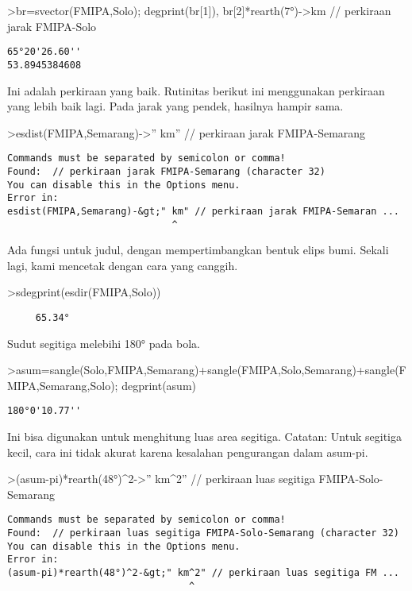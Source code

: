 \documentclass[
]{book}
\begin{document}
\textgreater br=svector(FMIPA,Solo); degprint(br{[}1{]}), br{[}2{]}*rearth(7°)-\textgreater km // perkiraan jarak FMIPA-Solo

\begin{verbatim}
65°20'26.60''
53.8945384608
\end{verbatim}

Ini adalah perkiraan yang baik. Rutinitas berikut ini menggunakan perkiraan yang lebih baik lagi. Pada jarak yang pendek, hasilnya hampir sama.

\textgreater esdist(FMIPA,Semarang)-\textgreater'' km'' // perkiraan jarak FMIPA-Semarang

\begin{verbatim}
Commands must be separated by semicolon or comma!
Found:  // perkiraan jarak FMIPA-Semarang (character 32)
You can disable this in the Options menu.
Error in:
esdist(FMIPA,Semarang)-&gt;" km" // perkiraan jarak FMIPA-Semaran ...
                             ^
\end{verbatim}

Ada fungsi untuk judul, dengan mempertimbangkan bentuk elips bumi. Sekali lagi, kami mencetak dengan cara yang canggih.

\textgreater sdegprint(esdir(FMIPA,Solo))

\begin{verbatim}
     65.34°
\end{verbatim}

Sudut segitiga melebihi 180° pada bola.

\textgreater asum=sangle(Solo,FMIPA,Semarang)+sangle(FMIPA,Solo,Semarang)+sangle(FMIPA,Semarang,Solo); degprint(asum)

\begin{verbatim}
180°0'10.77''
\end{verbatim}

Ini bisa digunakan untuk menghitung luas area segitiga. Catatan: Untuk segitiga kecil, cara ini tidak akurat karena kesalahan pengurangan dalam asum-pi.

\textgreater(asum-pi)*rearth(48°)\^{}2-\textgreater'' km\^{}2'' // perkiraan luas segitiga FMIPA-Solo-Semarang

\begin{verbatim}
Commands must be separated by semicolon or comma!
Found:  // perkiraan luas segitiga FMIPA-Solo-Semarang (character 32)
You can disable this in the Options menu.
Error in:
(asum-pi)*rearth(48°)^2-&gt;" km^2" // perkiraan luas segitiga FM ...
                                ^
\end{verbatim}
\end{document}
